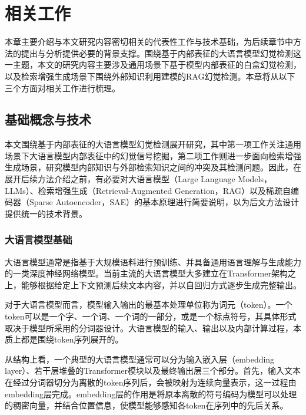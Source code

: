 \chapter{相关工作}\label{chp:related_work}

本章主要介绍与本文研究内容密切相关的代表性工作与技术基础，为后续章节中方法的提出与分析提供必要的背景支撑。围绕基于内部表征的大语言模型幻觉检测这一主题，本文的研究内容主要涉及通用场景下基于模型内部表征的白盒幻觉检测，以及检索增强生成场景下围绕外部知识利用建模的RAG幻觉检测。本章将从以下三个方面对相关工作进行梳理。

\section{基础概念与技术}\label{sec:llm_rag_sae_background}

本文围绕基于内部表征的大语言模型幻觉检测展开研究，其中第一项工作关注通用场景下大语言模型内部表征中的幻觉信号挖掘，第二项工作则进一步面向检索增强生成场景，研究模型内部知识与外部检索知识之间的冲突及其检测问题。因此，在展开后续方法介绍之前，有必要对大语言模型（Large Language Models，LLMs）、检索增强生成（Retrieval-Augmented Generation，RAG）以及稀疏自编码器（Sparse Autoencoder，SAE）的基本原理进行简要说明，以为后文方法设计提供统一的技术背景。

\subsection{大语言模型基础}

大语言模型通常是指基于大规模语料进行预训练、并具备通用语言理解与生成能力的一类深度神经网络模型\cite{vaswani2017attention,devlin2019bert,radford2018improving}。当前主流的大语言模型大多建立在Transformer\cite{vaswani2017attention}架构之上，能够根据给定上下文预测后续文本内容，并以自回归方式逐步生成完整输出。

对于大语言模型而言，模型输入输出的最基本处理单位称为词元（token）。一个token可以是一个字、一个词、一个词的一部分，或是一个标点符号，其具体形式取决于模型所采用的分词器设计。大语言模型的输入、输出以及内部计算过程，本质上都是围绕token序列展开的。

从结构上看，一个典型的大语言模型通常可以分为输入嵌入层（embedding layer）、若干层堆叠的Transformer模块以及最终输出层三个部分。首先，输入文本在经过分词器切分为离散的token序列后，会被映射为连续向量表示，这一过程由embedding层完成。embedding层的作用是将原本离散的符号编码为模型可以处理的稠密向量，并结合位置信息，使模型能够感知各token在序列中的先后关系。

